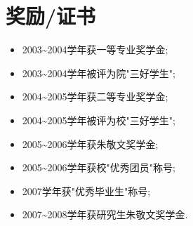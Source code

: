 \documentclass[a4paper,10pt,english]{manual}
\begin{document}
\section{奖励/证书}
\begin{itemize}
\item {} 
2003\textasciitilde{}2004学年获一等专业奖学金;

\item {} 
2003\textasciitilde{}2004学年被评为院"三好学生";

\item {} 
2004\textasciitilde{}2005学年获二等专业奖学金;

\item {} 
2004\textasciitilde{}2005学年被评为校"三好学生";

\item {} 
2005\textasciitilde{}2006学年获朱敬文奖学金;

\item {} 
2005\textasciitilde{}2006学年获校"优秀团员"称号;

\item {} 
2007学年获"优秀毕业生"称号;

\item {} 
2007\textasciitilde{}2008学年获研究生朱敬文奖学金.

\end{itemize}
\end{document}
